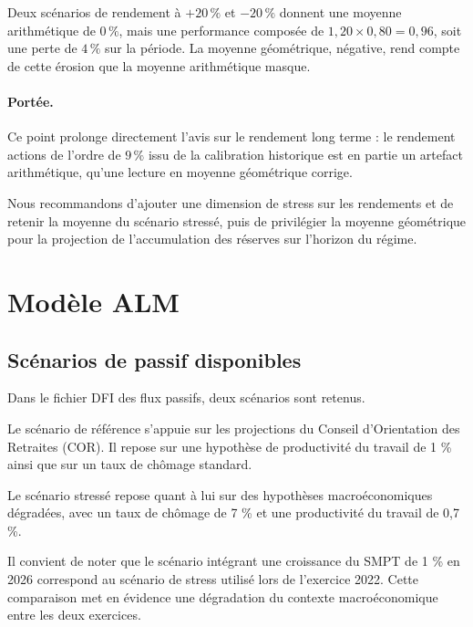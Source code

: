 \documentclass[11pt,a4paper]{article}
\begin{document}
\begin{exemplebox}
Deux scénarios de rendement à $+20\,\%$ et $-20\,\%$ donnent une moyenne arithmétique de $0\,\%$, mais une performance composée de $1{,}20 \times 0{,}80 = 0{,}96$, soit une perte de $4\,\%$ sur la période. La moyenne géométrique, négative, rend compte de cette érosion que la moyenne arithmétique masque.
\end{exemplebox}

\paragraph{Portée.} Ce point prolonge directement l'avis sur le rendement long terme : le rendement actions de l'ordre de $9\,\%$ issu de la calibration historique est en partie un artefact arithmétique, qu'une lecture en moyenne géométrique corrige.

\begin{insightbox}
Nous recommandons d'ajouter une dimension de stress sur les rendements et de retenir la moyenne du scénario stressé, puis de privilégier la moyenne géométrique pour la projection de l'accumulation des réserves sur l'horizon du régime.
\end{insightbox}

\section{Modèle ALM}

\subsection{Scénarios de passif disponibles}

Dans le fichier DFI des flux passifs, deux scénarios sont retenus.

Le scénario de référence s’appuie sur les projections du Conseil d’Orientation des Retraites (COR). Il repose sur une hypothèse de productivité du travail de 1 \% ainsi que sur un taux de chômage standard.

Le scénario stressé repose quant à lui sur des hypothèses macroéconomiques dégradées, avec un taux de chômage de 7 \% et une productivité du travail de 0,7 \%.

Il convient de noter que le scénario intégrant une croissance du SMPT de 1 \% en 2026 correspond au scénario de stress utilisé lors de l’exercice 2022. Cette comparaison met en évidence une dégradation du contexte macroéconomique entre les deux exercices.
\end{document}
